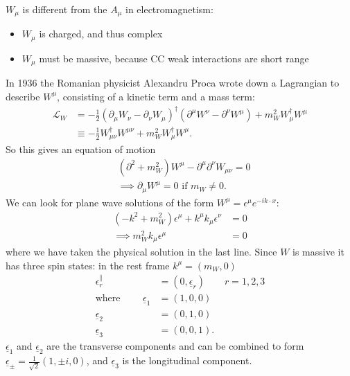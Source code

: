 $W_\mu$ is different from the $A_\mu$ in electromagnetism: 
\begin{itemize}
\item $W_\mu$ is charged, and thus complex
\item $W_\mu$ must be massive, because CC weak interactions are short range
\end{itemize}
In 1936 the Romanian physicist Alexandru Proca wrote down a Lagrangian to describe $W^\mu$, consisting of a kinetic term and a mass term:
\begin{equation}
\begin{split}
\mathcal{L}_W &= - \frac{1}{2}(\partial_\mu W_\nu - \partial_\nu W_\mu)^\dagger(\partial^\mu W^\nu - \partial^\nu W^\mu) + m_W^2 W_\mu^\dagger W^\mu \\
&\equiv -\frac{1}{2}W_{\mu \nu}^\dagger W^{\mu \nu} + m_W^2 W_\mu^\dagger W^\mu .
\end{split}
\end{equation}
So this gives an equation of motion
\begin{equation}
\begin{split}
&(\partial^2 + m_W^2) W^\mu - \partial^\mu \partial^\nu W_{\mu \nu} = 0 \\
&\implies \partial_\mu W^\mu =0 \text{ if } m_W \neq 0.
\end{split}
\end{equation}
We can look for plane wave solutions of the form $W^\mu = \epsilon^\mu e^{-i k \cdot x}$:
\begin{equation}
\begin{split}
(-k^2 + m_W^2)\epsilon^\mu + k^\mu k_\mu \epsilon^\nu &= 0 \\
\implies m_W^2 k_\mu \epsilon^\mu &= 0 
\end{split}
\end{equation}
where we have taken the physical solution in the last line. Since $W$ is massive it has three spin states: in the rest frame $k^\mu = (m_W, 0)$
\begin{equation}
\begin{split}
\epsilon_r^\parallel &= (0, \underline{\epsilon}_r) \qquad r=1,2,3 \\
\text{where } \qquad \underline{\epsilon}_1 &= (1,0,0) \\
\underline{\epsilon}_2 &= (0,1,0) \\
\underline{\epsilon}_3 &= (0,0,1). 
\end{split}
\end{equation}
$\underline{\epsilon}_1$ and $\underline{\epsilon}_2$ are the transverse components and can be combined to form $\underline{\epsilon}_\pm = \frac{1}{\sqrt{2}}(1, \pm i, 0)$, and $\underline{\epsilon}_3$ is the longitudinal component. 

